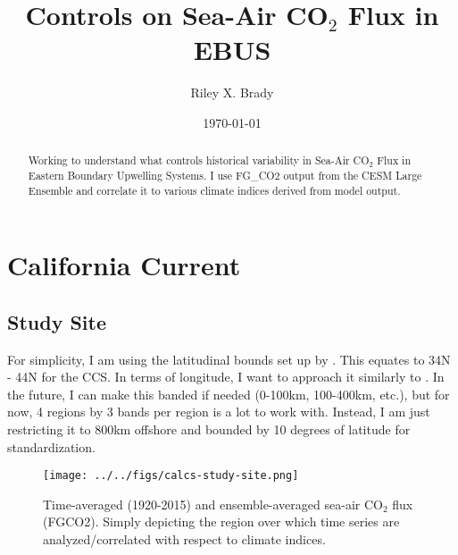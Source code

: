 \documentclass[]{article}
\title{Controls on Sea-Air CO$_{2}$ Flux in EBUS}
\author{Riley X. Brady}
\date{\today}
\begin{document}
\maketitle
\begin{abstract}
\noindent Working to understand what controls historical variability in Sea-Air CO$_{2}$ Flux in Eastern Boundary Upwelling Systems. I use FG\_CO2 output from the CESM Large Ensemble and correlate it to various climate indices derived from model output.
\end{abstract}

\section{California Current}

\subsection{Study Site}
For simplicity, I am using the latitudinal bounds set up by \citet{Chavez:2009}. This equates to 34N - 44N for the CCS. In terms of longitude, I want to approach it similarly to \citet{Turi:2014}. In the future, I can make this banded if needed (0-100km, 100-400km, etc.), but for now, 4 regions by 3 bands per region is a lot to work with. Instead, I am just restricting it to 800km offshore and bounded by 10 degrees of latitude for standardization.

\begin{figure}[!h]
	\centering
	\texttt{[image: ../../figs/calcs-study-site.png]}
	\caption{Time-averaged (1920-2015) and ensemble-averaged sea-air CO$_{2}$ flux (FGCO2). Simply depicting the region over which time series are analyzed/correlated with respect to climate indices.}
\end{figure}



\end{document}
